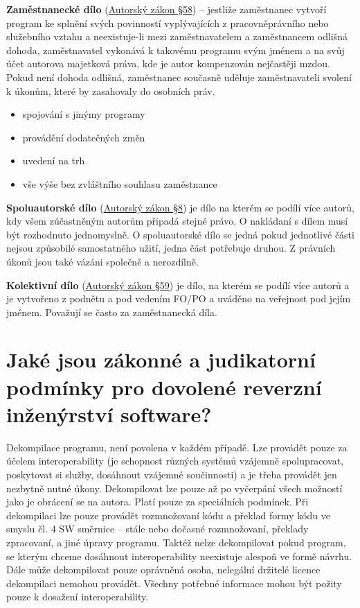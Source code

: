 \textbf{Zaměstnanecké dílo} (\href{https://www.zakonyprolidi.cz/cs/2000-121#p58}{Autorský zákon §58}) -- jestliže zaměstnanec vytvoří program ke splnění svých povinností vyplývajících z pracovněprávního nebo služebního vztahu a neexistuje-li mezi zaměstnavatelem a zaměstnancem odlišná dohoda, zaměstnavatel vykonává k takovému programu svým jménem a na svůj účet autorova majetková práva, kde je autor kompenzován nejčastěji mzdou. Pokud není dohoda odlišná, zaměstnanec současně uděluje zaměstnavateli svolení k úkonům, které by zasahovaly do osobních práv.
\begin{itemize}[noitemsep]
    \item spojování s jinýmy programy
    \item provádění dodatečných změn
    \item uvedení na trh
    \item vše výše bez zvláštního souhlasu zaměstnance
\end{itemize}

\textbf{Spoluautorské dílo} (\href{https://www.zakonyprolidi.cz/cs/2000-121#p8}{Autorský zákon §8}) je dílo na kterém se podílí více autorů, kdy všem zúčastněným autorům připadá stejné právo. O nakládaní s dílem musí být rozhodnuto jednomyslně. O spoluautorské dílo se jedná pokud jednotlivé části nejsou způsobilé samostatného užití, jedna část potřebuje druhou. Z právních úkonů jsou také vázáni společně a nerozdílně.

\textbf{Kolektivní dílo} (\href{https://www.zakonyprolidi.cz/cs/2000-121#p59}{Autorský zákon §59}) je dílo, na kterém se podílí více autorů a je vytvořeno z podnětu a pod vedením FO/PO a uváděno na veřejnost pod jejím jménem. Považují se často za zaměstnanecká díla.


\section{Jaké jsou zákonné a judikatorní podmínky pro dovolené reverzní inženýrství software?}

Dekompilace programu, není povolena v každém případě. Lze provádět pouze za účelem interoperability (je schopnost různých systémů vzájemně spolupracovat, poskytovat si služby, dosáhnout vzájemné součinnosti) a je třeba provádět jen nezbytně nutné úkony. Dekompilovat lze pouze až po vyčerpání všech možností jako je obrácení se na autora. Platí pouze za speciálních podmínek. Při dekompilaci lze pouze provádět rozmnožovaní kódu a překlad formy kódu ve smyslu čl. 4 SW směrnice -- stále nebo dočasné rozmnožovaní, překlady zpracovaní, a jiné úpravy programu. Taktéž nelze dekompilovat pokud program, se kterým chceme dosáhnout interoperability neexistuje alespoň ve formě návrhu. Dále může dekompilovat pouze oprávněná osoba, nelegální držitelé licence dekompilaci nemohou provádět. Všechny potřebné informace mohou být požity pouze k dosažení interoperability. 

